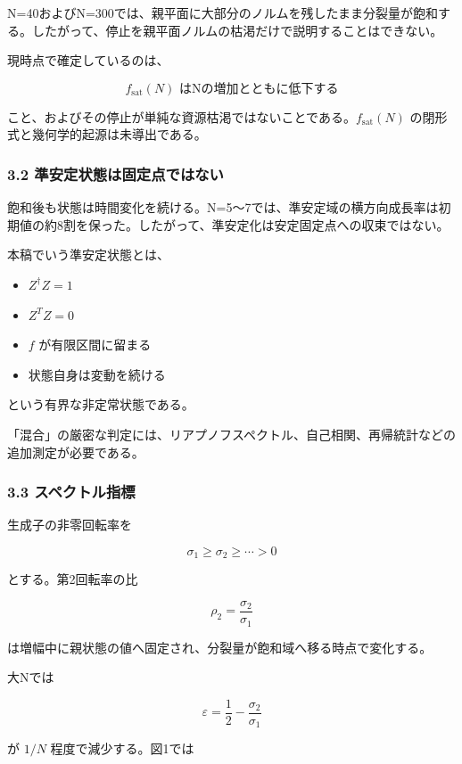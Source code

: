 \documentclass[
  a4paper,
]{ltjsarticle}
\providecommand{\tightlist}{%
  \setlength{\itemsep}{0pt}\setlength{\parskip}{0pt}}
\begin{document}
N=40およびN=300では、親平面に大部分のノルムを残したまま分裂量が飽和する。したがって、停止を親平面ノルムの枯渇だけで説明することはできない。

現時点で確定しているのは、

\[
\boxed{f_{\mathrm{sat}}(N)\text{ はNの増加とともに低下する}}
\]

こと、およびその停止が単純な資源枯渇ではないことである。\(f_{\mathrm{sat}}(N)\)
の閉形式と幾何学的起源は未導出である。

\subsubsection{3.2
準安定状態は固定点ではない}\label{ux6e96ux5b89ux5b9aux72b6ux614bux306fux56faux5b9aux70b9ux3067ux306fux306aux3044}

飽和後も状態は時間変化を続ける。N=5〜7では、準安定域の横方向成長率は初期値の約8割を保った。したがって、準安定化は安定固定点への収束ではない。

本稿でいう準安定状態とは、

\begin{itemize}
\tightlist
\item
  \(Z^\dagger Z=1\)
\item
  \(Z^T Z=0\)
\item
  \(f\) が有限区間に留まる
\item
  状態自身は変動を続ける
\end{itemize}

という有界な非定常状態である。

「混合」の厳密な判定には、リアプノフスペクトル、自己相関、再帰統計などの追加測定が必要である。

\subsubsection{3.3
スペクトル指標}\label{ux30b9ux30daux30afux30c8ux30ebux6307ux6a19}

生成子の非零回転率を

\[
\sigma_1\ge\sigma_2\ge\cdots>0
\]

とする。第2回転率の比

\[
\rho_2=\frac{\sigma_2}{\sigma_1}
\]

は増幅中に親状態の値へ固定され、分裂量が飽和域へ移る時点で変化する。

大Nでは

\[
\varepsilon
=
\frac12-\frac{\sigma_2}{\sigma_1}
\]

が \(1/N\) 程度で減少する。図1では
\end{document}
